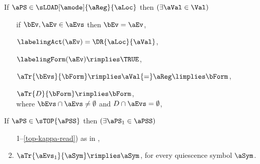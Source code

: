 \begin{definition}

  \noindent
  If $\aPS \in \sLOAD[\amode]{\aReg}{\aLoc}$ then %
  $(\exists\aVal\in\Val)$
  \begin{enumerate}[topsep=0pt]
  \item[{\labeltext[L1]{L1)}{L1}}] 
    if $\bEv,\aEv\in\aEvs$ then $\bEv=\aEv$,
  \item[{\labeltext[L2]{L2)}{L2}}]
    $\labelingAct(\aEv) = \DR{\aLoc}{\aVal}$,
  \item[{\labeltext[L3]{L3)}{L3}}]
    $\labelingForm(\aEv) \rimplies \TRUE$,
  \item[{\labeltext[L4]{L4)}{L4}}]
    $\aTr{\bEvs}{\bForm} \rimplies \aVal{=}\aReg\limplies\bForm$, 
  \item[{\labeltext[L5]{L5)}{L5}}]
    $\aTr{\cEvs}{\bForm} \rimplies \bForm$, %
    \\ where $\bEvs\cap\aEvs\neq\emptyset$ and $\cEvs\cap\aEvs=\emptyset$,
  \end{enumerate}
  If $\aPS \in \sTOP{\aPSS}$ then
  $(\exists\aPS_1\in\aPSS)$
  \begin{enumerate}[topsep=0pt]
    \setcounter{enumi}{\value{pomsetPreTopCount}}
  \item[1--\ref{top-kappa-read})] as in ,    
  \item $\aTr{\aEvs_1}{\aSym} \rimplies \aSym$, for every quiescence symbol $\aSym$.
  \end{enumerate}
\end{definition}
